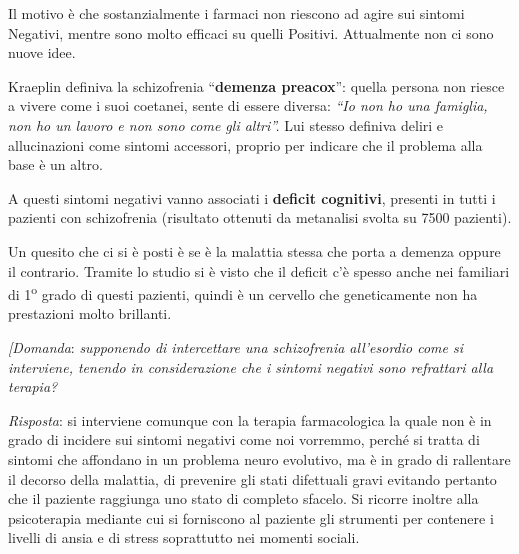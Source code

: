 Il motivo è che sostanzialmente i farmaci non riescono ad agire sui
sintomi Negativi, mentre sono molto efficaci su quelli Positivi.
Attualmente non ci sono nuove idee.

Kraeplin definiva la schizofrenia ``\textbf{demenza preacox}'': quella
persona non riesce a vivere come i suoi coetanei, sente di essere
diversa: \emph{``Io non ho una famiglia, non ho un lavoro e non sono
come gli altri''.} Lui stesso definiva deliri e allucinazioni come
sintomi accessori, proprio per indicare che il problema alla base è un
altro.

A questi sintomi negativi vanno associati i \textbf{deficit cognitivi},
presenti in tutti i pazienti con schizofrenia (risultato ottenuti da
metanalisi svolta su 7500 pazienti).

Un quesito che ci si è posti è se è la malattia stessa che porta a
demenza oppure il contrario. Tramite lo studio si è visto che il deficit
c'è spesso anche nei familiari di 1\textsuperscript{o} grado di questi pazienti, quindi è
un cervello che geneticamente non ha prestazioni molto brillanti.

\emph{{[}Domanda}: \emph{supponendo di intercettare una schizofrenia
all'esordio come si interviene, tenendo in considerazione che i sintomi
negativi sono refrattari alla terapia? }

\emph{Risposta}: si interviene comunque con la terapia farmacologica la
quale non è in grado di incidere sui sintomi negativi come noi vorremmo,
perché si tratta di sintomi che affondano in un problema neuro
evolutivo, ma è in grado di rallentare il decorso della malattia, di
prevenire gli stati difettuali gravi evitando pertanto che il paziente
raggiunga uno stato di completo sfacelo. Si ricorre inoltre alla
psicoterapia mediante cui si forniscono al paziente gli strumenti per
contenere i livelli di ansia e di stress soprattutto nei momenti
sociali.

